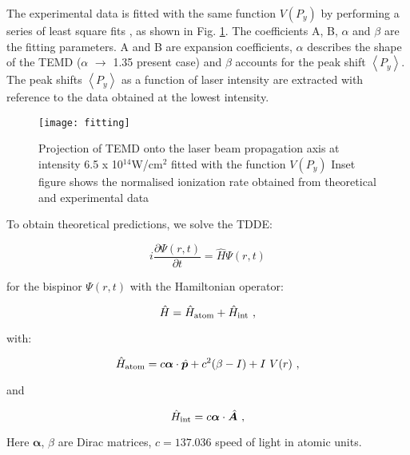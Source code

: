 \documentclass[aps,prl,twocolumn,superscriptaddress,amsmath,amssymb]{revtex4-1}
\begin{document}
The experimental data is fitted with the same function $V(P_{y})$ by performing a series of least square fits , as shown in Fig. \ref{fig:fitting}. The coefficients A, B, $\alpha$ and $\beta$ are the fitting parameters. A and B are expansion coefficients, $\alpha$ describes the shape of the TEMD ($\alpha$ $\to$ 1.35 present case) and $\beta$ accounts for the peak shift $\left\langle P_{y}\right\rangle$. The peak shifts $\left\langle P_{y}\right\rangle$ as a function of laser intensity are extracted with reference to the data obtained at the lowest intensity. 

\begin{figure}[!ht]
\texttt{[image: fitting]}
\caption{\label{fig:fitting}} Projection of TEMD onto the laser beam propagation axis at intensity 6.5 x 10$^{14}$W/cm$^{2}$ fitted with the function $V(P_{y})$ Inset figure shows the normalised ionization rate obtained from theoretical and experimental data
\end{figure} 

To obtain theoretical predictions, we solve the TDDE:

\begin{equation}
i\frac{\partial \Psi(r,t)}{\partial t}=\hat{H} \Psi(r,t)
\label{d}
\end{equation}

for the bispinor $\Psi(r,t)$ with the Hamiltonian operator: 

\begin{equation}
\hat H = \hat H_{\rm atom}+ \hat H_{\rm int}
\label{h}\ ,
\end{equation}

with:

\begin{equation}
\hat H_{\rm atom}=c{\bm \alpha}\cdot {\hat{\bm p}}+
c^2(\beta-I)+ I\ V(r)\ ,
\label{hatom}
\end{equation}

and

\begin{equation}
\hat H_{\rm int}=c{\bm \alpha}\cdot {\hat {\bm A}} \ ,
\label{hint}
\end{equation}


Here $\bm \alpha$, $\beta$ are Dirac matrices, $c=137.036$ speed of light in atomic units. %
\end{document}
